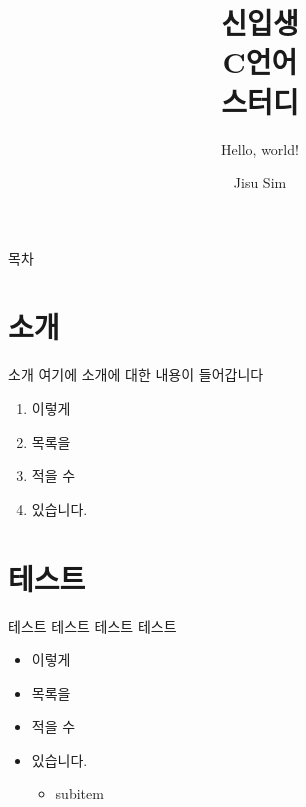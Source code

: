 \documentclass[aspectratio=169]{beamer}
\title{신입생\\\textbf{C언어}\\스터디}
\subtitle{Hello, world!}
\author{Jisu Sim}
\institute{소프트웨어학과 소학회 A.N.S.I.}
\begin{document}
\begin{frame}[plain]
    \titlepage
\end{frame}

\begin{frame}{목차}
    \tableofcontents
\end{frame}

\section{소개}

\begin{frame}[plain]
    \sectionpage
\end{frame}

\begin{frame}{소개}
    여기에 소개에 대한 내용이 들어갑니다
    \begin{enumerate}
        \item 이렇게
        \item 목록을
        \item 적을 수
        \item 있습니다.
    \end{enumerate}
\end{frame}

\section{테스트}

\begin{frame}[plain]
    \sectionpage
\end{frame}

\begin{frame}{테스트}
    테스트 테스트 테스트
    \begin{itemize}
        \item 이렇게
        \item 목록을
        \item 적을 수
        \item 있습니다.
        \begin{itemize}
            \item subitem
        \end{itemize}
    \end{itemize}
\end{frame}
\end{document}

